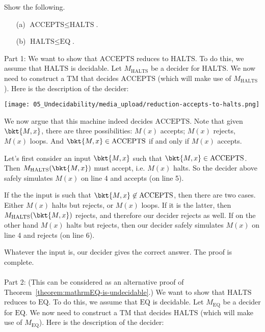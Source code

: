 \begin{flex}
\label{grp:exercise:Practice-with-reduction-proofs}

\begin{exercise}
\label{exercise:Practice-with-reduction-proofs}
Show the following.
\begin{enumerate}
    \item[(a)] $\text{ACCEPTS} \leq \text{HALTS}$.
    \item[(b)] $\text{HALTS} \leq \text{EQ}$.
\end{enumerate}

\end{exercise}

\begin{solution}
\label{sol:Undecidable-Languages::want}
Part 1: We want to show that $\text{ACCEPTS}$ reduces to $\text{HALTS}$. To do this, we assume that $\text{HALTS}$ is decidable. Let $M_\text{HALTS}$ be a decider for $\text{HALTS}$. We now need to construct a TM that decides $\text{ACCEPTS}$ (which will make use of $M_\text{HALTS}$). Here is the description of the decider:

\begin{center}
\texttt{[image: 05\_Undecidability/media\_upload/reduction-accepts-to-halts.png]}
\end{center}

We now argue that this machine indeed decides $\text{ACCEPTS}$. Note that given $\bkt{M,x}$, there are three possibilities: $M(x)$ accepts; $M(x)$ rejects, $M(x)$ loops. And $\bkt{M,x} \in \text{ACCEPTS}$ if and only if $M(x)$ accepts. 

Let's first consider an input $\bkt{M,x}$ such that $\bkt{M,x} \in \text{ACCEPTS}$. Then $M_\text{HALTS}(\bkt{M,x})$ must accept, i.e. $M(x)$ halts. So the decider above safely simulates $M(x)$ on line 4 and accepts (on line 5).

If the the input is such that $\bkt{M,x} \not \in \text{ACCEPTS}$, then there are two cases. Either $M(x)$ halts but rejects, or $M(x)$ loops. If it is the latter, then $M_\text{HALTS}(\bkt{M,x})$ rejects, and therefore our decider rejects as well. If on the other hand $M(x)$ halts but rejects, then our decider safely simulates $M(x)$ on line 4 and rejects (on line 6).

Whatever the input is, our decider gives the correct answer. The proof is complete.
\\\\
\noindent
Part 2: (This can be considered as an alternative proof of Theorem~\ref{theorem:mathrmEQ-is-undecidable}.) We want to show that $\text{HALTS}$ reduces to $\text{EQ}$. To do this, we assume that $\text{EQ}$ is decidable. Let $M_\text{EQ}$ be a decider for $\text{EQ}$. We now need to construct a TM that decides $\text{HALTS}$ (which will make use of $M_\text{EQ}$). Here is the description of the decider:


\end{solution}
\end{flex}
